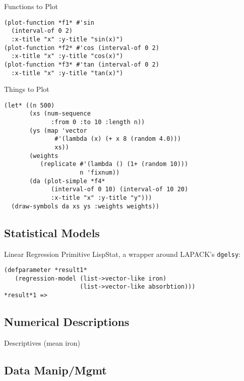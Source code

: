 \documentclass{beamer}
\begin{document}
\begin{frame}[fragile]{Functions to Plot}
\begin{verbatim}
(plot-function *f1* #'sin
  (interval-of 0 2)
  :x-title "x" :y-title "sin(x)")
(plot-function *f2* #'cos (interval-of 0 2)
  :x-title "x" :y-title "cos(x)")
(plot-function *f3* #'tan (interval-of 0 2)
  :x-title "x" :y-title "tan(x)")
\end{verbatim}
\end{frame}

\begin{frame}[fragile]{Things to Plot}
\begin{verbatim}
(let* ((n 500)
       (xs (num-sequence
             :from 0 :to 10 :length n))
       (ys (map 'vector
              #'(lambda (x) (+ x 8 (random 4.0)))
              xs))
       (weights
          (replicate #'(lambda () (1+ (random 10)))
                     n 'fixnum))
       (da (plot-simple *f4*
             (interval-of 0 10) (interval-of 10 20)
             :x-title "x" :y-title "y")))
  (draw-symbols da xs ys :weights weights))
\end{verbatim}
\end{frame}

\subsection{Statistical Models}
\label{sec:work:statmod}


\begin{frame}[fragile]{Linear Regression}
  Primitive LispStat, a wrapper around LAPACK's \texttt{dgelsy}:
\begin{verbatim}
(defparameter *result1*
   (regression-model (list->vector-like iron)
                     (list->vector-like absorbtion)))
*result*1 =>

\end{verbatim}
\end{frame}

\subsection{Numerical Descriptions}
\label{sec:work:numdesc}

\begin{frame}[fragile]{Descriptives}
  (mean iron)
  
\end{frame}

\subsection{Data Manip/Mgmt}
\label{sec:work:data}
\end{document}
